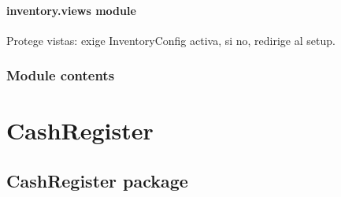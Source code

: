 \documentclass[a4paper,11pt,spanish]{sphinxmanual}
\begin{document}
\subsubsection{inventory.views module}
\label{\detokenize{api/inventory/inventory.views:module-inventory.views}}\label{\detokenize{api/inventory/inventory.views:inventory-views-module}}\label{\detokenize{api/inventory/inventory.views::doc}}

\begin{fulllineitems}
\label{\detokenize{api/inventory/inventory.views:inventory.views.require_active_inventory_config}}
\pysigstartsignatures
\pysiglinewithargsret
{}
{}
{}
\pysigstopsignatures
\sphinxAtStartPar
Protege vistas: exige InventoryConfig activa, si no, redirige al setup.

\end{fulllineitems}



\subsection{Module contents}
\label{\detokenize{api/inventory/inventory:module-inventory}}\label{\detokenize{api/inventory/inventory:module-contents}}
\sphinxstepscope


\chapter{CashRegister}
\label{\detokenize{api/CashRegister/modules:cashregister}}\label{\detokenize{api/CashRegister/modules::doc}}
\sphinxstepscope


\section{CashRegister package}
\label{\detokenize{api/CashRegister/CashRegister:cashregister-package}}\label{\detokenize{api/CashRegister/CashRegister::doc}}
\end{document}
